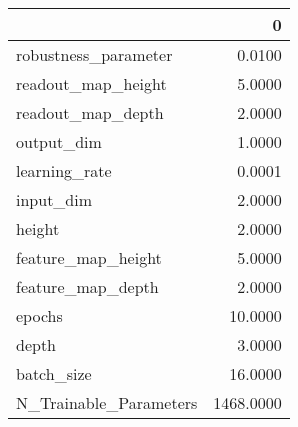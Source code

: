 \begin{tabular}{lr}
\toprule
{} &          0 \\
\midrule
robustness\_parameter   &     0.0100 \\
readout\_map\_height     &     5.0000 \\
readout\_map\_depth      &     2.0000 \\
output\_dim             &     1.0000 \\
learning\_rate          &     0.0001 \\
input\_dim              &     2.0000 \\
height                 &     2.0000 \\
feature\_map\_height     &     5.0000 \\
feature\_map\_depth      &     2.0000 \\
epochs                 &    10.0000 \\
depth                  &     3.0000 \\
batch\_size             &    16.0000 \\
N\_Trainable\_Parameters &  1468.0000 \\
\bottomrule
\end{tabular}
